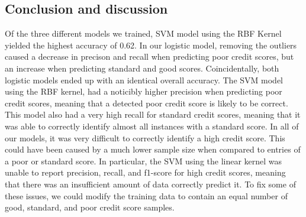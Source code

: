 \documentclass[11pt]{article}
\begin{document}
\begin{multicols}{2}
\section*{Conclusion and discussion}
Of the three different models we trained, SVM model using the RBF Kernel yielded the highest
accuracy of 0.62. In our logistic model, removing the outliers caused a decrease in precison
and recall when predicting poor credit scores, but an increase when predicting standard and good
scores. Coincidentally, both logistic models ended up with an identical overall accuracy.
\vspace{5mm}\newline
The SVM model using the RBF kernel, had a noticibly higher precision when predicting poor credit
scores, meaning that a detected poor credit score is likely to be correct. This model also had a
very high recall for standard credit scores, meaning that it was able to correctly identify almost all
instances with a standard score.
\vspace{5mm}\newline
In all of our models, it was very difficult to correctly identify a high credit score. This could have
been caused by a much lower sample size when compared to entries of a poor or standard score. In particular,
the SVM using the linear kernel was unable to report precision, recall, and f1-score for high credit scores,
meaning that there was an insufficient amount of data correctly predict it. To fix some of these issues,
we could modify the training data to contain an equal number of good, standard, and poor credit score samples. 


\end{multicols}
\end{document}
